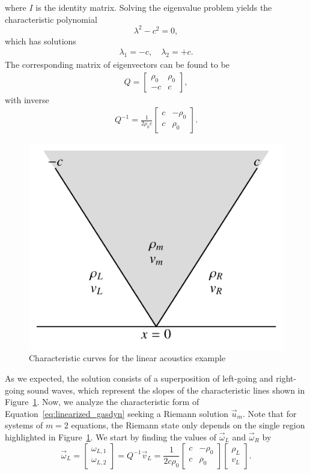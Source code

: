 where $I$ is the identity matrix. Solving the eigenvalue problem yields the characteristic polynomial 
\begin{equation}
	\lambda^2 - c^2 = 0,
\end{equation}
which has solutions 
\begin{align}
	\lambda_1 = -c, \quad
	\lambda_2 = +c.
\end{align}
The corresponding matrix of eigenvectors can be found to be
\begin{align}
	Q = 
	\begin{bmatrix}
		\rho_0 & \rho_0 \\
		-c & c
	\end{bmatrix},
\end{align}
with inverse
\begin{align}
	Q^{-1}= 
	\frac{1}{2\rho_0 c}
	\begin{bmatrix}
		c & -\rho_0 \\
		c & \rho_0
	\end{bmatrix}.
\end{align}
\begin{figure}[htbp]
	\centering
	\includegraphics[width=0.5\linewidth]{Pictures/riem_linacoustics_characteristics}
	\caption{Characteristic curves for the linear acoustics example}
	\label{fig:acoustics_charact}
\end{figure}
As we expected, the solution consists of a superposition of left-going and right-going sound waves, which represent the slopes of the characteristic lines shown in Figure~\ref{fig:acoustics_charact}. Now, we analyze the characteristic form of Equation~\ref{eq:linearized_gasdyn} seeking a Riemann solution $\vec u_m$. Note that for systems of $m=2$ equations, the Riemann state only depends on the single region highlighted in Figure~\ref{fig:acoustics_charact}. We start by finding the values of $\vec \omega_L$ and $\vec \omega_R$ by
\begin{equation}
	\vec \omega_L = 
	\begin{bmatrix}
		\omega_{L,1} \\ \omega_{L,2}
	\end{bmatrix}
	= Q^{-1} \vec v_L = \frac{1}{2c\rho_0}
	\begin{bmatrix}
		c & -\rho_0 \\
		c & \rho_0 
	\end{bmatrix}
	\begin{bmatrix}
		\rho_L \\ v_L
	\end{bmatrix}.
\end{equation}
